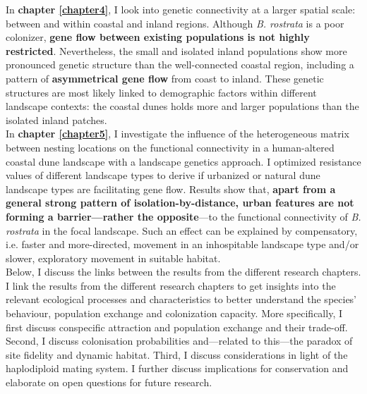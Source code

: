 \documentclass[10pt, twoside]{book} %
\begin{document}
	In \textbf{chapter \ref{chapter4}}, I look into genetic connectivity at a larger spatial scale: between and within coastal and inland regions. Although \textit{B. rostrata} is a poor colonizer, \textbf{gene flow between existing populations is not highly restricted}. Nevertheless, the small and isolated inland populations show more pronounced genetic structure than the well-connected coastal region, including a pattern of \textbf{asymmetrical gene flow} from coast to inland. These genetic structures are most likely linked to demographic factors within different landscape contexts: the coastal dunes holds more and larger populations than the isolated inland patches.\\
	
	In \textbf{chapter \ref{chapter5}}, I investigate the influence of the heterogeneous matrix between nesting locations on the functional connectivity in a human-altered coastal dune landscape with a landscape genetics approach. I optimized resistance values of different landscape types to derive if urbanized or natural dune landscape types are facilitating gene flow. Results show that, \textbf{apart from a general strong pattern of isolation-by-distance, urban features are not forming a barrier---rather the opposite}---to the functional connectivity of \textit{B. rostrata} in the focal landscape. Such an effect can be explained by compensatory, i.e. faster and more-directed, movement in an inhospitable landscape type and/or slower, exploratory movement in suitable habitat.\\
	
	Below, I discuss the links between the results from the different research chapters. I link the results from the different research chapters to get insights into the relevant ecological processes and characteristics to better understand the species' behaviour, population exchange and colonization capacity. More specifically, I first discuss conspecific attraction and population exchange and their trade-off. Second, I discuss colonisation probabilities and---related to this---the paradox of site fidelity and dynamic habitat. Third, I discuss considerations in light of the haplodiploid mating system. I further discuss implications for conservation and elaborate on open questions for future research.\\
	\clearpage
	
\end{document}
